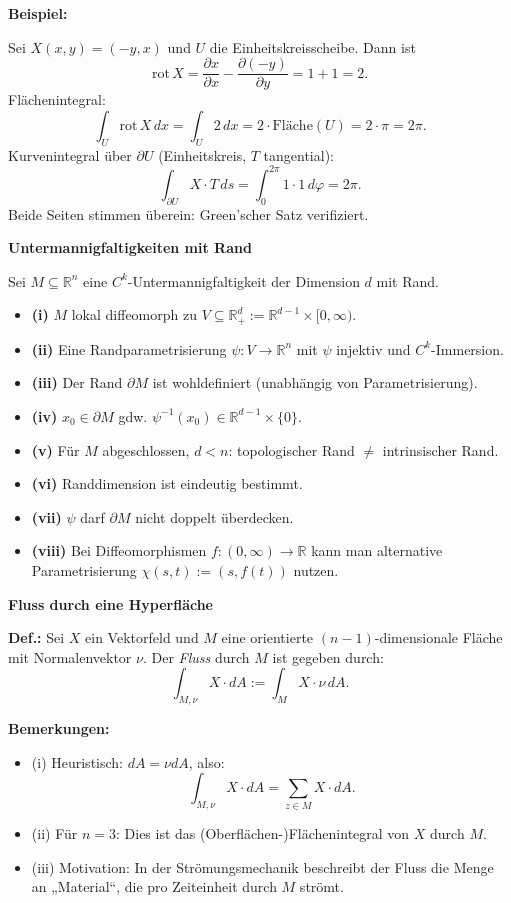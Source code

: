 \textbf{Beispiel:}

Sei $X(x,y) = (-y, x)$ und $U$ die Einheitskreisscheibe. Dann ist
\[
\mathrm{rot}\, X = \frac{\partial x}{\partial x} - \frac{\partial (-y)}{\partial y} = 1 + 1 = 2.
\]
Flächenintegral:
\[
\int_U \mathrm{rot}\, X \, dx = \int_U 2 \, dx = 2 \cdot \text{Fläche}(U) = 2 \cdot \pi = 2\pi.
\]
Kurvenintegral über $\partial U$ (Einheitskreis, $T$ tangential):
\[
\int_{\partial U} X \cdot T \, ds = \int_0^{2\pi} 1 \cdot 1 \, d\varphi = 2\pi.
\]
Beide Seiten stimmen überein: Green'scher Satz verifiziert.

\textbf{Untermannigfaltigkeiten mit Rand}

Sei $M \subseteq \mathbb{R}^n$ eine $C^k$-Untermannigfaltigkeit der Dimension $d$ mit Rand.

\begin{itemize}
  \item \textbf{(i)} $M$ lokal diffeomorph zu $V \subseteq \mathbb{R}_+^d := \mathbb{R}^{d-1} \times [0,\infty)$.
  \item \textbf{(ii)} Eine Randparametrisierung $\psi: V \to \mathbb{R}^n$ mit $\psi$ injektiv und $C^k$-Immersion.
  \item \textbf{(iii)} Der Rand $\partial M$ ist wohldefiniert (unabhängig von Parametrisierung).
  \item \textbf{(iv)} $x_0 \in \partial M$ gdw. $\psi^{-1}(x_0) \in \mathbb{R}^{d-1} \times \{0\}$.
  \item \textbf{(v)} Für $M$ abgeschlossen, $d < n$: topologischer Rand $\ne$ intrinsischer Rand.
  \item \textbf{(vi)} Randdimension ist eindeutig bestimmt.
  \item \textbf{(vii)} $\psi$ darf $\partial M$ nicht doppelt überdecken.
  \item \textbf{(viii)} Bei Diffeomorphismen $f: (0,\infty) \to \mathbb{R}$ kann man alternative Parametrisierung $\chi(s,t) := (s, f(t))$ nutzen.
\end{itemize}

\textbf{Fluss durch eine Hyperfläche}

\textbf{Def.:} Sei $X$ ein Vektorfeld und $M$ eine orientierte $(n{-}1)$-dimensionale Fläche mit Normalenvektor $\nu$. Der \emph{Fluss} durch $M$ ist gegeben durch:
\[
\int_{M,\nu} X \cdot dA := \int_M X \cdot \nu \, dA.
\]

\textbf{Bemerkungen:}
\begin{itemize}
  \item (i) Heuristisch: $dA = \nu dA$, also:
  \[
  \int_{M,\nu} X \cdot dA = \sum_{z \in M} X \cdot dA.
  \]
  \item (ii) Für $n = 3$: Dies ist das (Oberflächen-)Flächenintegral von $X$ durch $M$.
  \item (iii) Motivation: In der Strömungsmechanik beschreibt der Fluss die Menge an „Material“, die pro Zeiteinheit durch $M$ strömt.
\end{itemize}

